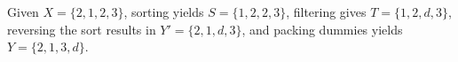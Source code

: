 
Given $X=\{2,1,2,3\}$, sorting yields $S=\{1,2,2,3\}$, filtering gives $T=\{1,2,d,3\}$, reversing the sort results in $Y'=\{2,1,d,3\}$, and packing dummies yields $Y=\{2,1,3,d\}$.



